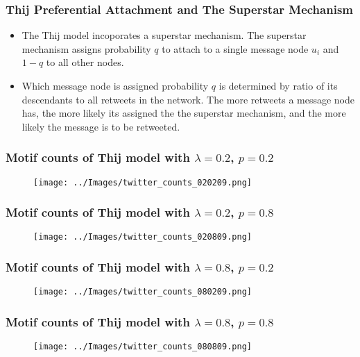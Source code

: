 \documentclass{beamer}
\begin{document}
\begin{frame}
    \frametitle{Thij Preferential Attachment and The Superstar Mechanism}
    \begin{itemize}
        \item The Thij model incoporates a superstar mechanism. The superstar mechanism 
            assigns probability $q$ to attach to a single message node $u_i$ and $1-q$ to all other nodes.
        \item Which message node is assigned probability $q$ is determined by ratio of its descendants
         to all retweets in the network. The more retweets a message node has, the more likely 
         its assigned the the superstar mechanism, and the more likely the message is to be retweeted. 
    \end{itemize}
\end{frame}

\begin{frame}
    \frametitle{Motif counts of Thij model with $\lambda=0.2$, $p=0.2$}
    \begin{figure}
        \texttt{[image: ../Images/twitter\_counts\_020209.png]}
    \centering
    \end{figure}
\end{frame}

\begin{frame}
    \frametitle{Motif counts of Thij model with $\lambda=0.2$, $p=0.8$}
    \begin{figure}
        \texttt{[image: ../Images/twitter\_counts\_020809.png]}
    \centering
    \end{figure}
\end{frame}

\begin{frame}
    \frametitle{Motif counts of Thij model with $\lambda=0.8$, $p=0.2$}
    \begin{figure}
        \texttt{[image: ../Images/twitter\_counts\_080209.png]}
    \centering
    \end{figure}
\end{frame}

\begin{frame}
    \frametitle{Motif counts of Thij model with $\lambda=0.8$, $p=0.8$}
    \begin{figure}
        \texttt{[image: ../Images/twitter\_counts\_080809.png]}
    \centering
    \end{figure}
\end{frame}
\end{document}
